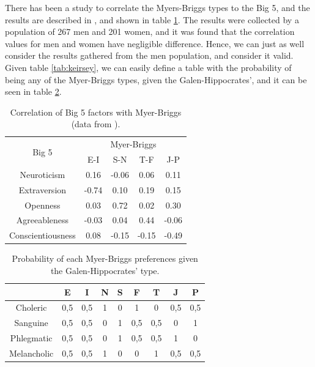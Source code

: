 There has been a study to correlate the Myers-Briggs types to the Big 5, and the results are described in \cite{mccrae1989reinterpreting}, and shown in table \ref{tab:big5mb}. The results were collected by a population of 267 men and 201 women, and it was found that the correlation values for men and women have negligible difference. Hence, we can just as well consider the results gathered from the men population, and consider it valid.
Given table \ref{tab:keirsey}, we can easily define a table with the probability of being any of the Myer-Briggs types, given the Galen-Hippocrates', and it can be seen in table \ref{tab:prob-myers-galen}.
\begin{table}[H]
    \caption{Correlation of Big 5 factors with Myer-Briggs (data from \cite{mccrae1989reinterpreting}).}
    \centering
    \scriptsize
    \begin{tabular}{|c|c|c|c|c|}
    \hline
    \multirow{2}{4em}{Big 5} & \multicolumn{4}{|c|}{Myer-Briggs} \\
    \cline{2-5}
         & E-I & S-N & T-F & J-P\\
        \hline
        \hline
        Neuroticism & 0.16 & -0.06 & 0.06 & 0.11\\
        \hline
        Extraversion & -0.74 & 0.10 & 0.19 & 0.15 \\
        \hline
       	Openness & 0.03 & 0.72 & 0.02 & 0.30 \\
        \hline
		Agreeableness & -0.03 & 0.04 & 0.44 & -0.06 \\
        \hline
		Conscientiousness & 0.08 & -0.15 & -0.15 & -0.49 \\
        \hline
    \end{tabular}
    \label{tab:big5mb}
\end{table}
\begin{table}[H]
	\caption{Probability of each Myer-Briggs preferences given the Galen-Hippocrates' type.}
   	\centering
    \scriptsize
    \begin{tabular}{|c||c|c||c|c||c|c||c|c|}
    	\hline
    	& E & I & N & S & F & T & J & P\\
      	\hline
        Choleric & 0,5 & 0,5 & 1 & 0 & 1 & 0 & 0,5 & 0,5\\
		\hline
        Sanguine & 0,5 & 0,5 & 0 & 1 & 0,5 & 0,5 & 0 & 1\\
        \hline
		Phlegmatic & 0,5 & 0,5 & 0 & 1 & 0,5 & 0,5 & 1 & 0\\
		\hline
        Melancholic & 0,5 & 0,5 & 1 & 0 & 0 & 1 & 0,5 & 0,5\\
        \hline
    \end{tabular}
    \label{tab:prob-myers-galen}
\end{table}
